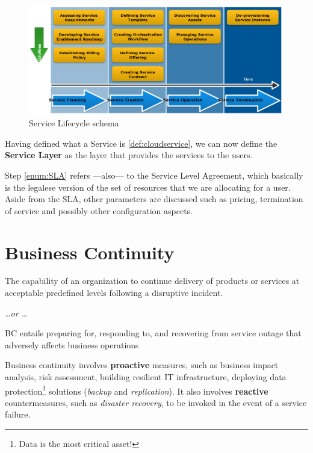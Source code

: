 \begin{figure}[htbp]
   \centering
   \includegraphics{images/servicelifecycle.png}
   \caption{Service Lifecycle schema}
   \label{fig:servicelifecycle}
\end{figure}

Having defined what a Service is \ref{def:cloudservice}, we can now define the \textbf{Service Layer} as the layer that provides the services to the users.

Step \ref{enum:SLA} refers ---also--- to the Service Level Agreement, which basically is the legalese version of the set of resources that we are allocating for a user.\\
Aside from the SLA, other parameters are discussed such as pricing, termination of service and possibly other configuration aspects.


\section{Business Continuity}
\begin{definition}
   The capability of an organization to continue delivery of products or services at acceptable predefined levels following a disruptive incident.

   \emph{\dots or \dots}
   
   BC entails preparing for, responding to, and recovering from service outage that adversely affects business operations
\end{definition}

Business continuity involves \textbf{proactive} measures, such as business impact analysis, risk assessment, building resilient IT infrastructure, deploying data protection\footnote{Data is the most critical asset!} solutions (\textit{backup} and \textit{replication}).
It also involves \textbf{reactive} countermeasures, such as \textit{disaster recovery}, to be invoked in the event of a service failure.



